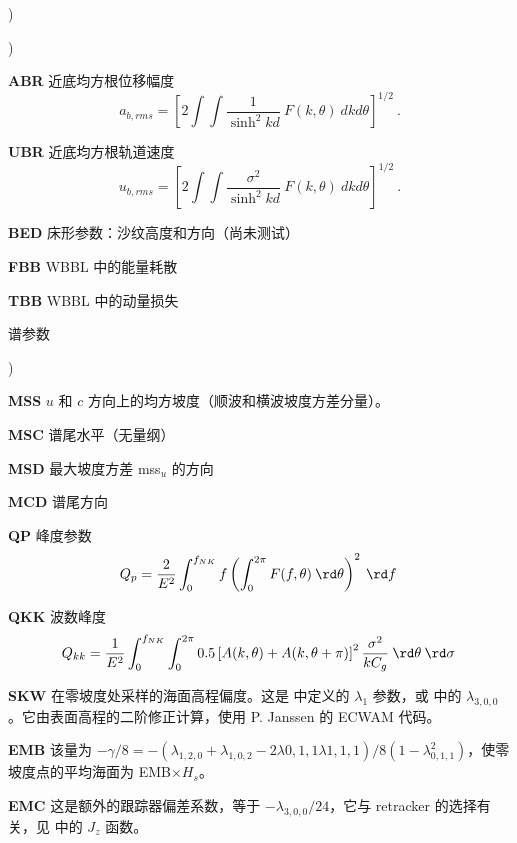 \begin{list}{)\hfill}
\begin{list}{)\hfill}
\item \textbf{ABR} 近底均方根位移幅度
      \begin{equation} a_{b,rms} = \left [ 2 \int \!\!\!\! \int
      \frac{1}{\sinh^2 kd} \: F(k,\theta) \: dk d\theta \right ] ^{1/2}
      \: . \label{eq:ab_rms} \end{equation}
\item \textbf{UBR} 近底均方根轨道速度
      \begin{equation} u_{b,rms} = \left [ 2 \int \!\!\!\! \int
      \frac{\sigma^2}{\sinh^2 kd} \: F(k,\theta) \: dk d\theta \right ] ^{1/2}
      \: . \label{eq:ub_rms} \end{equation}
\item \textbf{BED} 床形参数：沙纹高度和方向（尚未测试）
\item \textbf{FBB} WBBL 中的能量耗散
\item \textbf{TBB} WBBL 中的动量损失
\end{list}

\item{谱参数}

\begin{list}{)\hfill}
            { \leftmargin 8mm 
             \rightmargin 0mm \itemsep 0mm \parsep 0mm}

\item \textbf{MSS} $u$ 和 $c$ 方向上的均方坡度（顺波和横波坡度方差分量）。
\item \textbf{MSC} 谱尾水平（无量纲）
\item \textbf{MSD} 最大坡度方差 mss$_u$ 的方向
\item \textbf{MCD} 谱尾方向
\item \textbf{QP} 峰度参数 \citep{art:G70}
      \begin{equation} Q_p = \frac{2}{E^2} \int_0^{f_{NK}} f \left( \int_0^{2\pi} 
      F(f,\theta) \:\rd \theta \right)^2 \: \rd  f \: \label{eq:qp}
      \end{equation}
\item \textbf{QKK} 波数峰度 \citep{art:DC23}
      \begin{equation} Q_{kk} = \frac{1}{E^2} \int_0^{f_{NK}} \int_0^{2\pi} 
      0.5 \left[ A(k,\theta)+ A(k,\theta+\pi)\right]^2 \frac{\sigma^2}{k C_g} \:\rd \theta  \: \rd  \sigma \: \label{eq:qkk}
      \end{equation}
\item \textbf{SKW} 在零坡度处采样的海面高程偏度。这是 \cite{Barrick&Lipa1985} 中定义的 $\lambda_1$ 参数，或 \cite{Srokosz1986} 中的 $\lambda_{3,0,0}$。它由表面高程的二阶修正计算，使用 P. Janssen 的 ECWAM 代码。
\item \textbf{EMB} 该量为 $-\gamma/8 = -(\lambda_{1,2,0}+\lambda_{1,0,2}-2 \lambda{0,1,1} \lambda{1,1,1})/8 (1-\lambda_{0,1,1}^2)$，使零坡度点的平均海面为 EMB$\times H_s$。
\item \textbf{EMC} 这是额外的跟踪器偏差系数，等于 $-\lambda_{3,0,0}/24$，它与 retracker 的选择有关，见 \cite{DeCarlo&Ardhuin2024} 中的 $J_z$ 函数。
\end{list}


\end{list}
